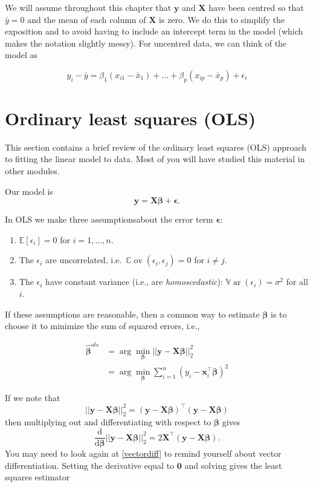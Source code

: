 \documentclass[
]{book}
\providecommand{\tightlist}{%
  \setlength{\itemsep}{0pt}\setlength{\parskip}{0pt}}
\theoremstyle{definition}
\theoremstyle{definition}
\theoremstyle{definition}
\theoremstyle{definition}
\theoremstyle{remark}
\begin{document}
We will assume throughout this chapter that \(\mathbf y\) and \(\mathbf X\) have been centred so that \(\bar{y}=0\) and the mean of each column of \(\mathbf X\) is zero. We do this to simplify the exposition and to avoid having to include an intercept term in the model (which makes the notation slightly messy). For uncentred data, we can think of the model as

\[y_i - \bar{y} = \beta_1 (x_{i1}-\bar{x}_1)+\ldots+\beta_p (x_{ip}-\bar{x}_p)+\epsilon_i\]

\hypertarget{ordinary-least-squares-ols}{%
\section{Ordinary least squares (OLS)}\label{ordinary-least-squares-ols}}

This section contains a brief review of the ordinary least squares (OLS) approach to fitting the linear model to data. Most of you will have studied this material in other modules.

Our model is
\[
\mathbf y=\mathbf X\boldsymbol \beta+{\pmb \epsilon}.
\]

In OLS we make three assumptionsabout the error term \(\boldsymbol \epsilon\):

\begin{enumerate}
\def\labelenumi{\arabic{enumi}.}
\tightlist
\item
  \({\mathbb{E}}[\epsilon_i]=0\) for \(i=1, \ldots , n\).
\item
  The \(\epsilon_i\) are uncorrelated, i.e.~\({\mathbb{C}\operatorname{ov}}(\epsilon_i, \epsilon_j)=0\) for \(i \neq j\).
\item
  The \(\epsilon_i\) have constant variance (i.e., are \emph{homoscedastic}): \({\mathbb{V}\operatorname{ar}}(\epsilon_i)=\sigma^2\) for all \(i\).
\end{enumerate}

If these assumptions are reasonable, then
a common way to estimate \(\boldsymbol \beta\) is to choose it to minimize the sum of squared errors, i.e.,

\begin{align*}
{\hat{\boldsymbol \beta}}^{ols} &= \arg \min_{\boldsymbol \beta} || \mathbf y- \mathbf X\boldsymbol \beta||_2^2\\
&= \arg \min_{\boldsymbol \beta} \sum_{i=1}^n (y_i - \mathbf x_i^\top \boldsymbol \beta)^2
\end{align*}

If we note that
\[|| \mathbf y- \mathbf X\boldsymbol \beta||_2^2 = (\mathbf y-\mathbf X\boldsymbol \beta)^\top(\mathbf y-\mathbf X\boldsymbol \beta) \]
then multiplying out and differentiating with respect to \(\boldsymbol \beta\) gives
\[\frac{\mathrm d}{\mathrm d\boldsymbol \beta} || \mathbf y- \mathbf X\boldsymbol \beta||_2^2 = 2\mathbf X^\top (\mathbf y- \mathbf X\boldsymbol \beta).\]
You may need to look again at \ref{vectordiff} to remind yourself about vector differentiation. Setting the derivative equal to \({\boldsymbol 0}\) and solving gives the least squares estimator
\end{document}
